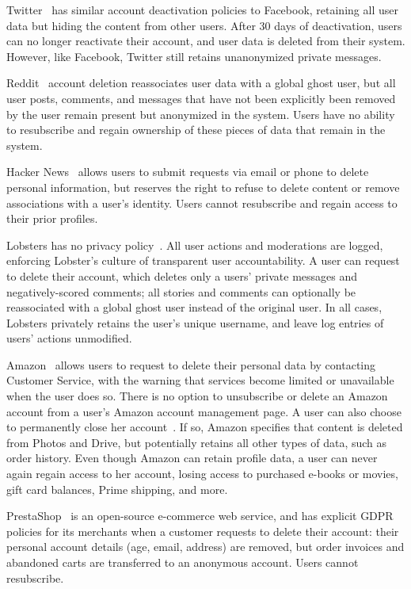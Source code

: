 Twitter~\cite{twitter:privacy} has similar account deactivation policies to Facebook, retaining all
user data but hiding the content from other users. After 30 days of deactivation, users can no
longer reactivate their account, and user data is deleted from their system.  However, like
Facebook, Twitter still retains unanonymized private messages.

Reddit~\cite{reddit:privacy} account deletion reassociates user data with a global ghost user, but
all user posts, comments, and messages that have not been explicitly been removed by the user remain
present but anonymized in the system. Users have no ability to resubscribe and regain
ownership of these pieces of data that remain in the system. 

Hacker News~\cite{hackernews:privacy} allows users to submit requests via email or phone to delete
personal information, but reserves the right to refuse to delete content or remove associations with
a user's identity.  Users cannot resubscribe and regain access to their prior profiles.

Lobsters has no privacy policy~\cite{lobsters:privacy}. All user actions and moderations are
logged, enforcing Lobster's culture of transparent user accountability. A user can request to delete
their account, which deletes only a users' private messages and negatively-scored comments; all
stories and comments can optionally be reassociated with a global ghost user instead of the original
user. In all cases, Lobsters privately retains the user's unique username, and leave log entries of users'
actions unmodified.

Amazon~\cite{amazon:privacy} allows users to request to delete their personal data by contacting
Customer Service, with the warning that services become limited or unavailable when the user does
so. There is no option to unsubscribe or delete an Amazon account from a user's Amazon account
management page.  A user can also choose to permanently close her account~\cite{amazon:close}. If
so, Amazon specifies that content is deleted from Photos and Drive, but potentially retains all other types
of data, such as order history. Even though Amazon can retain profile data, a user can never
again regain access to her account, losing access to purchased e-books or movies, gift card
balances, Prime shipping, and more.

PrestaShop~\cite{prestashop:privacy} is an open-source e-commerce web service, and has explicit GDPR
policies for its merchants when a customer requests to delete their account: their personal account
details (age, email, address) are removed, but order invoices and abandoned carts are transferred to
an anonymous account. Users cannot resubscribe.

